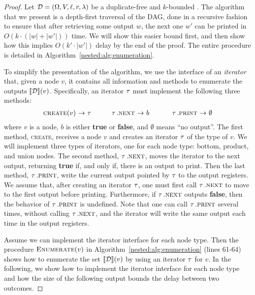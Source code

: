 

\begin{proof}
Let $\mathcal{D} = (\Omega, V, \ell, r, \lambda)$ be a duplicate-free and $k$-bounded \dsabbr{}.
The algorithm that we present is a depth-first traversal of the DAG, done in a recursive fashion to ensure that after retrieving some output $w$, the next one $w'$ can be printed in $O(k\cdot (|w| + |w'|))$ time. We will show this easier bound first, and then show how this implies $O(k'\cdot |w'|)$ delay by the end of the proof. The entire procedure is detailed in Algorithm~\ref{nested:alg:enumeration}.



To simplify the presentation of the algorithm, we use the interface of an \emph{iterator} that, given a node $v$, it contains all information and methods to enumerate the outputs ${\llbracket{\mathcal{D}}\rrbracket}(v)$. Specifically, an iterator $\operatorname{\tau}$ must implement the following three methods:
\[
\begin{array}{rclrclrcl}
	\textsc{create}(v) & \!\!\!\!\rightarrow\!\!\!\! & \uit   \ \ \ \ \ \	 & \uit.\textsc{next} & \!\!\!\! \rightarrow \!\!\!\! & b  \ \ \ \ \ \ \ &  \uit.\textsc{print}  & \!\!\!\!\rightarrow\!\!\!\! & \emptyset
\end{array}
\]
where $v$ is a node, $b$ is either {\bf true} or {\bf false}, and $\emptyset$ means ``no output''. 
The first method, \textsc{create}, receives a node $v$ and creates an iterator $\operatorname{\tau}$ of the type of $v$. We will implement three types of iterators, one for each node type: bottom, product, and union nodes. The second method, $\operatorname{\tau}.\textsc{next}$, moves the iterator to the next output, returning {\bf true} if, and only if, there is an output to print. Then the last method, $\operatorname{\tau}.\textsc{print}$, write the current output pointed by $\operatorname{\tau}$ to the output registers. 
We assume that, after creating an iterator $\operatorname{\tau}$, one must first call $\operatorname{\tau}.\textsc{next}$ to move to the first output before printing. Furthermore, if $\operatorname{\tau}.\textsc{next}$ outputs {\bf false}, then the behavior of $\operatorname{\tau}.\textsc{print}$ is undefined. Note that one can call $\operatorname{\tau}.\textsc{print}$ several times, without calling $\operatorname{\tau}.\textsc{next}$, and the iterator will write the same output each time in the output registers. 

Assume we can implement the iterator interface for each node type. Then the procedure $\textsc{Enumerate}(v)$ in Algorithm~\ref{nested:alg:enumeration} (lines 61-64) shows how to enumerate the set ${\llbracket{\mathcal{D}}\rrbracket}(v)$ by using an iterator $\operatorname{\tau}$ for $v$. In the following, we show how to implement the iterator interface for each node type and how the size of the following output bounds the delay between two outcomes.


\end{proof}
